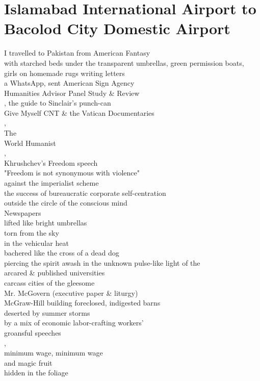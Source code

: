 \documentclass[smalldemyvopaper,11pt,twoside,onecolumn,openright,extrafontsizes]{memoir}
\begin{document}
\chapter{Islamabad International Airport to Bacolod City Domestic Airport}
I travelled to Pakistan from American Fantasy
\\with starched beds under the transparent umbrellas, green permission boats,
\\girls on homemade rugs writing letters
\\a WhatsApp, sent American Sign Agency
\\Humanities Advisor Panel Study \& Review
\\, the guide to Sinclair's punch-can
\\Give Myself CNT \& the Vatican Documentaries
\\,
\\The
\\World Humanist
\\,
\\Khrushchev's Freedom speech
\\"Freedom is not synonymous with violence"
\\against the imperialist scheme
\\the success of bureaucratic corporate self-centration
\\outside the circle of the conscious mind
\\Newspapers
\\lifted like bright umbrellas
\\torn from the sky
\\in the vehicular heat
\\bachered like the cross of a dead dog
\\piercing the spirit awash in the unknown pulse-like light of the
\\arcared \& published universities
\\carcass cities of the gleesome
\\Mr. McGovern (executive paper \& liturgy)
\\McGraw-Hill building foreclosed, indigested barns
\\deserted by summer storms
\\by a mix of economic labor-crafting workers'
\\groansful speeches
\\,
\\minimum wage, minimum wage
\\and magic fruit
\\hidden in the foliage
\end{document}
